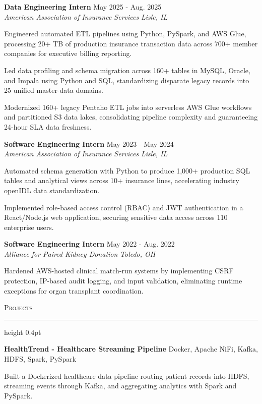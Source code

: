 \documentclass[letterpaper,11pt]{article}
\newcommand{\resumesection}[1]{%
  \par\vspace{2pt}%
  {\large\scshape #1}\par\vspace{2pt}%
  \hrule height 0.4pt\vspace{2pt}%
}
\newcommand{\resumeSubheading}[4]{
  \textbf{#1} \hfill #2\\
  \textit{#3} \hfill \textit{#4}
}
\newcommand{\projectHeading}[2]{
  \textbf{#1} \hfill #2
}
\begin{document}
\resumeSubheading
{Data Engineering Intern}{May 2025 - Aug. 2025}
{American Association of Insurance Services}{Lisle, IL}
\begin{tightitemize}
  \item Engineered automated ETL pipelines using Python, PySpark, and AWS Glue, processing 20+ TB of production insurance transaction data across 700+ member companies for executive billing reporting.
  \item Led data profiling and schema migration across 160+ tables in MySQL, Oracle, and Impala using Python and SQL, standardizing disparate legacy records into 25 unified master-data domains.
  \item Modernized 160+ legacy Pentaho ETL jobs into serverless AWS Glue workflows and partitioned S3 data lakes, consolidating pipeline complexity and guaranteeing 24-hour SLA data freshness.
\end{tightitemize}

\resumeSubheading
{Software Engineering Intern}{May 2023 - May 2024}
{American Association of Insurance Services}{Lisle, IL}
\begin{tightitemize}
  \item Automated schema generation with Python to produce 1,000+ production SQL tables and analytical views across 10+ insurance lines, accelerating industry openIDL data standardization.
  \item Implemented role-based access control (RBAC) and JWT authentication in a React/Node.js web application, securing sensitive data access across 110 enterprise users.
\end{tightitemize}

\resumeSubheading
{Software Engineering Intern}{May 2022 - Aug. 2022}
{Alliance for Paired Kidney Donation}{Toledo, OH}
\begin{tightitemize}
  \item Hardened AWS-hosted clinical match-run systems by implementing CSRF protection, IP-based audit logging, and input validation, eliminating runtime exceptions for organ transplant coordination.
\end{tightitemize}

\resumesection{Projects}
\projectHeading{HealthTrend - Healthcare Streaming Pipeline}{Docker, Apache NiFi, Kafka, HDFS, Spark, PySpark}
\begin{tightitemize}
  \item Built a Dockerized healthcare data pipeline routing patient records into HDFS, streaming events through Kafka, and aggregating analytics with Spark and PySpark.
\end{tightitemize}
\end{document}
